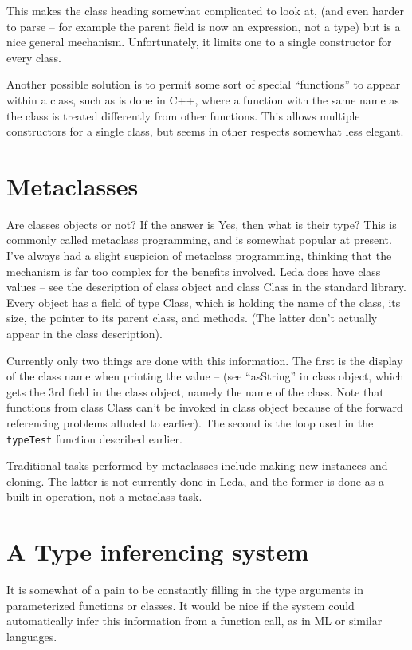 This makes the class heading somewhat complicated to look at, (and even
harder to parse -- for example the parent field is now an expression,
not a type) but is a nice general mechanism.
Unfortunately, it limits one to a single constructor for every class.

Another possible solution is to permit some sort of special ``functions''
to appear within a class, such as is done in C++, where a function
with the same name as the class is treated differently from other
functions.  This allows multiple constructors for a single class,
but seems in other respects somewhat less elegant.

\section{Metaclasses}

Are classes objects or not?  If the answer is Yes, then what is their type?
This is commonly called metaclass programming, and is somewhat popular at
present.  I've always had a slight suspicion of metaclass programming,
thinking that the mechanism is far too complex for the benefits involved.
Leda does have class values -- see the description of class object
and class Class in the standard library.
Every object has a field of type Class,
which is holding the name of the class, its size, the pointer to its
parent class, and methods.  (The
latter don't actually appear in the class description).

Currently only two things are done with this information.
The first is the display
of the class name when printing the value -- (see ``asString'' in
class object, which gets the 3rd field in the class object, namely
the name of the class.  Note that functions from class Class can't be
invoked in class object because of the forward referencing problems
alluded to earlier).  The second is the loop used in the {\tt typeTest}
function described earlier.

Traditional tasks performed by metaclasses include making new
instances and cloning.  The latter is not currently done in Leda, and
the former is done as a built-in operation, not a metaclass task.

\section{A Type inferencing system}

It is somewhat of a pain to be constantly filling in the type
arguments in parameterized functions or classes.  It would be nice
if the system could automatically infer this information from a function
call, as in ML or similar languages.
